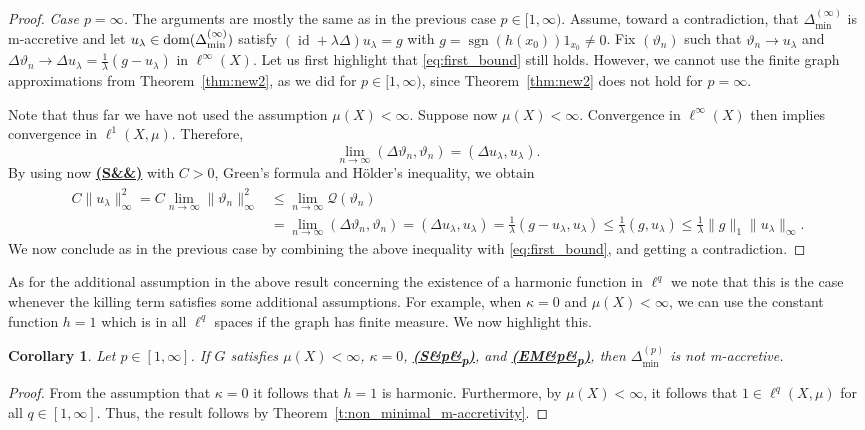 \documentclass[letterpaper]{article}
\newtheorem{corollary}[lemma]{Corollary}
\theoremstyle{definition}
\theoremstyle{named}
\numberwithin{equation}{section}
\newcommand{\EM}[1][]{\hyperlink{ass:EM}{\textup{\textbf{(EM\ifx&#1&\else\textsubscript{#1}\fi)}}}}
\newcommand{\SP}[1][]{\hyperlink{ass:SP}{\textup{\textbf{(S\ifx&#1&\else\textsubscript{#1}\fi)}}}}
\newcommand{\Q}{\mathcal{Q}}
\newcommand{\lm}{\lambda}
\newcommand{\sgn}{\operatorname{sgn}}
\newcommand{\dom}{\textnormal{dom}} %
\newcommand{\id}{\operatorname{id}}
\newcommand{\deltam}{\Delta_{\min}}
\begin{document}
\begin{proof}
\medskip
\noindent
\textit{Case $p = \infty$.} The arguments are mostly the same as in the 
previous case $p\in [1,\infty)$. Assume, toward a contradiction, 
that $\deltam^{(\infty)}$ is m-accretive and 
let $u_\lm \in \dom(\deltam^{(\infty)})$ satisfy $(\id + \lm \Delta)u_\lm =g$ 
with $g = \sgn(h(x_0))1_{x_0}\neq 0$.  
Fix $(\vartheta_n)$ such that $\vartheta_n \to u_\lm$ and 
$\Delta \vartheta_n \to \Delta u_\lm  =  \frac{1}{\lm}(g-u_\lm)$ in $\ell^\infty(X)$. 
Let us first highlight that \eqref{eq:first_bound} still holds.  
However, we cannot use the finite graph approximations from 
Theorem~\ref{thm:new2}, as we did for $p\in [1,\infty)$, since
Theorem~\ref{thm:new2} does not hold  for $p=\infty$. 

Note that thus far we have not used the assumption $\mu(X) < \infty$. 
Suppose now $\mu(X) < \infty$. Convergence in $\ell^\infty(X)$  then implies convergence 
in $\ell^1(X,\mu)$. Therefore,
$$
\lim_{n \to \infty}( \Delta \vartheta_n, \vartheta_n) = ( \Delta u_\lm, u_\lm ).
$$
By using now \SP[] with $C>0$, Green's formula and
    H{\"o}lder's inequality, we obtain
\begin{align*}
        C \|u_\lm\|_\infty^2 = C \lim_{n \to \infty} \|\vartheta_n\|_\infty^2 &\leq \lim_{n \to \infty} \Q(\vartheta_n) \\
        &= \lim_{n \to \infty}( \Delta \vartheta_n, \vartheta_n) = ( \Delta u_\lm, u_\lm )
        = \frac{1}{\lm} ( g-u_\lm, u_\lm ) \leq \frac{1}{\lm}(g, u_\lm) \leq \frac{1}{\lm} \|g\|_1 \|u_\lm\|_\infty.
    \end{align*} 
We now conclude as in the previous case by combining the above inequality with \eqref{eq:first_bound}, and getting a contradiction. 
\end{proof}


As for the additional assumption in the above result concerning the existence of 
a harmonic function in $\ell^q$ we note that this is the case whenever the killing term
satisfies some additional assumptions. For example, when $\kappa=0$ and $\mu(X)<\infty$, 
we can use
the constant function $h=1$ which is in all $\ell^q$ spaces if the graph has finite measure. 
We now highlight this.
\begin{corollary}\label{c:non_minimal_m-accretivity_killing}
    Let $p \in [1,\infty]$.
    If $G$ satisfies $\mu(X)<\infty$, $\kappa =0$, \SP[p], and \EM[p], 
    then $\deltam^{(p)}$ is not m-accretive.
\end{corollary}
\begin{proof}
    From the assumption that $\kappa =0$ it follows that $h=1$ is harmonic. Furthermore,
    by $\mu(X)<\infty$, it follows that $1 \in \ell^q(X,\mu)$ for all $q \in [1,\infty]$.
    Thus, the result follows
    by Theorem~\ref{t:non_minimal_m-accretivity}.
    \end{proof}    
\end{document}
